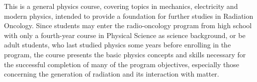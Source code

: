 {This is a general physics course, covering topics in mechanics, electricity and modern physics, intended to provide a foundation for further studies in Radiation Oncology.
Since students may enter the radio-oncology program from high school with only a fourth-year course in Physical Science as science background, or be adult students, who last studied physics some years before enrolling in the program, the course presents the basic physics concepts and skills necessary for the successful completion of many of the program objectives, especially those concerning the generation of radiation and its interaction with matter.}
